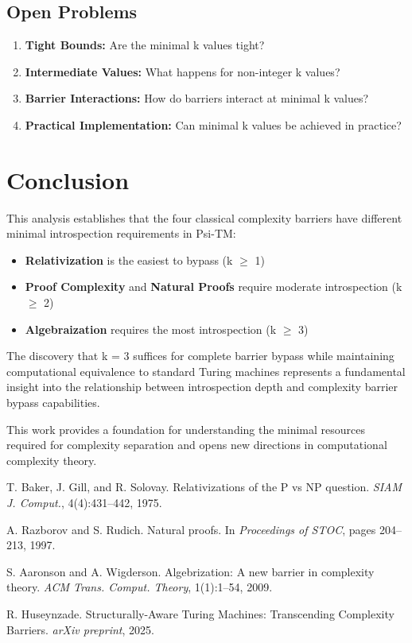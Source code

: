 \documentclass[11pt]{article}
\begin{document}
\subsection{Open Problems}

\begin{enumerate}
\item \textbf{Tight Bounds:} Are the minimal k values tight?
\item \textbf{Intermediate Values:} What happens for non-integer k values?
\item \textbf{Barrier Interactions:} How do barriers interact at minimal k values?
\item \textbf{Practical Implementation:} Can minimal k values be achieved in practice?
\end{enumerate}

\section{Conclusion}

This analysis establishes that the four classical complexity barriers have different minimal introspection requirements in Psi-TM:

\begin{itemize}
\item \textbf{Relativization} is the easiest to bypass (k $\geq$ 1)
\item \textbf{Proof Complexity} and \textbf{Natural Proofs} require moderate introspection (k $\geq$ 2)
\item \textbf{Algebraization} requires the most introspection (k $\geq$ 3)
\end{itemize}

The discovery that k = 3 suffices for complete barrier bypass while maintaining computational equivalence to standard Turing machines represents a fundamental insight into the relationship between introspection depth and complexity barrier bypass capabilities.

This work provides a foundation for understanding the minimal resources required for complexity separation and opens new directions in computational complexity theory.

\begin{thebibliography}{9}
 T. Baker, J. Gill, and R. Solovay. Relativizations of the P vs NP question. \emph{SIAM J. Comput.}, 4(4):431--442, 1975.

 A. Razborov and S. Rudich. Natural proofs. In \emph{Proceedings of STOC}, pages 204--213, 1997.

 S. Aaronson and A. Wigderson. Algebrization: A new barrier in complexity theory. \emph{ACM Trans. Comput. Theory}, 1(1):1--54, 2009.

 R. Huseynzade. Structurally-Aware Turing Machines: Transcending Complexity Barriers. \emph{arXiv preprint}, 2025.
\end{thebibliography}
\end{document}
